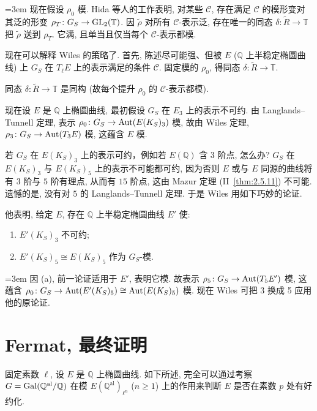 {\emergencystretch=3em 现在假设 $\rho_0$ 模. Hida 等人的工作表明, 对某些 $\mathcal{C}$, 存在满足 $\mathcal{C}$ 的模形变对其泛的形变 $\rho_T\colon G_S\to\operatorname{GL}_2(\mathbb{T})$. 因 $\tilde{\rho}$ 对所有 $\mathcal{C}$-表示泛, 存在唯一的同态 $\delta\colon\tilde{R}\to\mathbb{T}$ 把 $\tilde{\rho}$ 送到 $\rho_T$. 它满, 且单当且仅当每个 $\mathcal{C}$-表示都模.\par}

现在可以解释 Wiles 的策略了. 首先, 陈述尽可能强、但被 $E$ ($\mathbb{Q}$ 上半稳定椭圆曲线) 上 $G_S$ 在 $T_\ell E$ 上的表示满足的条件 $\mathcal{C}$. 固定模的 $\rho_0$, 得同态 $\delta\colon\tilde{R}\to\mathbb{T}$.

\begin{theorem}[Wiles] \label{thm:5.8.7} 
同态 $\delta\colon\tilde{R}\to\mathbb{T}$ 是同构 (故每个提升 $\rho_0$ 的 $\mathcal{C}$-表示都模).
\end{theorem}

现在设 $E$ 是 $\mathbb{Q}$ 上椭圆曲线, 最初假设 $G_S$ 在 $E_3$ 上的表示不可约. 由 Langlands--Tunnell 定理, 表示 $\rho_0\colon G_S\to\operatorname{Aut}(E(K_S)_3)$ 模, 故由 Wiles 定理, $\rho_3\colon G_S\to\operatorname{Aut}(T_3E)$ 模, 这蕴含 $E$ 模.

若 $G_S$ 在 $E(K_S)_3$ 上的表示可约，例如若 $E(\mathbb{Q})$ 含 $3$ 阶点, 怎么办? $G_S$ 在 $E(K_S)_3$ 与 $E(K_S)_5$ 上的表示不可能都可约, 因为否则 $E$ 或与 $E$ 同源的曲线将有 $3$ 阶与 $5$ 阶有理点, 从而有 $15$ 阶点, 这由 Mazur 定理 (II~\ref{thm:2.5.11}) 不可能. 遗憾的是, 没有对 $5$ 的 Langlands--Tunnell 定理. 于是 Wiles 用如下巧妙的论证.

他表明, 给定 $E$, 存在 $\mathbb{Q}$ 上半稳定椭圆曲线 $E'$ 使:
\begin{enumerate}[label=\textup{(\alph*)}]
\item $E'(K_S)_3$ 不可约;
\item $E'(K_S)_5\cong E(K_S)_5$ 作为 $G_S$-模.
\end{enumerate}
{\emergencystretch=3em 因 (a), 前一论证适用于 $E'$, 表明它模. 故表示 $\rho_5\colon G_S\to\operatorname{Aut}(T_5E')$ 模, 这蕴含 $\rho_0\colon G_S\to\operatorname{Aut}(E'(K_S)_5)\cong\operatorname{Aut}(E(K_S)_5)$ 模. 现在 Wiles 可把 3 换成 5 应用他的原论证.\par}

\section{Fermat, 最终证明}\label{sec:5.9}

固定素数 $\ell$, 设 $E$ 是 $\mathbb{Q}$ 上椭圆曲线. 如下所述, 完全可以通过考察 $G = \operatorname{Gal}(\mathbb{Q}^{\mathrm{al}}/\mathbb{Q})$ 在模 $E(\mathbb{Q}^{\mathrm{al}})_{\ell^n}$ ($n\ge 1$) 上的作用来判断 $E$ 是否在素数 $p$ 处有好约化.

